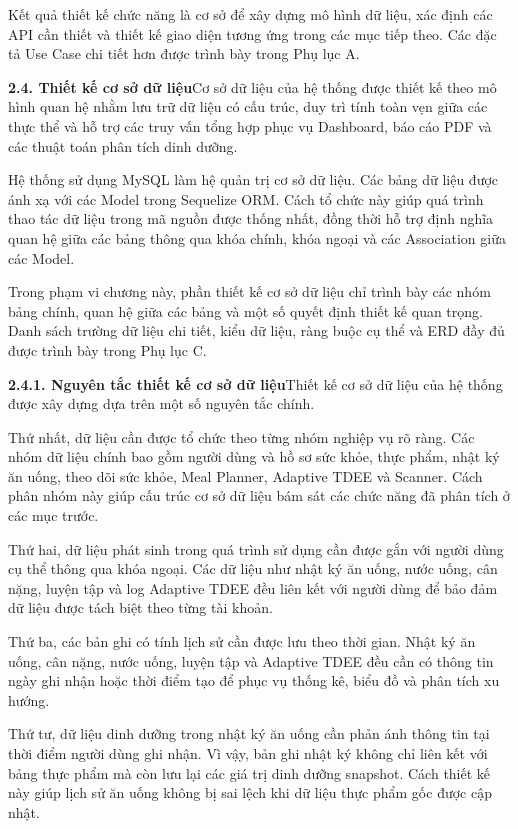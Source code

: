 Kết quả thiết kế chức năng là cơ sở để xây dựng mô hình dữ liệu, xác định các API cần thiết và thiết kế giao diện tương ứng trong các mục tiếp theo. Các đặc tả Use Case chi tiết hơn được trình bày trong Phụ lục A.

\textbf{2.4. Thiết kế cơ sở dữ liệu}Cơ sở dữ liệu của hệ thống được thiết kế theo mô hình quan hệ nhằm lưu trữ dữ liệu có cấu trúc, duy trì tính toàn vẹn giữa các thực thể và hỗ trợ các truy vấn tổng hợp phục vụ Dashboard, báo cáo PDF và các thuật toán phân tích dinh dưỡng.

Hệ thống sử dụng MySQL làm hệ quản trị cơ sở dữ liệu. Các bảng dữ liệu được ánh xạ với các Model trong Sequelize ORM. Cách tổ chức này giúp quá trình thao tác dữ liệu trong mã nguồn được thống nhất, đồng thời hỗ trợ định nghĩa quan hệ giữa các bảng thông qua khóa chính, khóa ngoại và các Association giữa các Model.

Trong phạm vi chương này, phần thiết kế cơ sở dữ liệu chỉ trình bày các nhóm bảng chính, quan hệ giữa các bảng và một số quyết định thiết kế quan trọng. Danh sách trường dữ liệu chi tiết, kiểu dữ liệu, ràng buộc cụ thể và ERD đầy đủ được trình bày trong Phụ lục C.

\textbf{2.4.1. Nguyên tắc thiết kế cơ sở dữ liệu}Thiết kế cơ sở dữ liệu của hệ thống được xây dựng dựa trên một số nguyên tắc chính.

Thứ nhất, dữ liệu cần được tổ chức theo từng nhóm nghiệp vụ rõ ràng. Các nhóm dữ liệu chính bao gồm người dùng và hồ sơ sức khỏe, thực phẩm, nhật ký ăn uống, theo dõi sức khỏe, Meal Planner, Adaptive TDEE và Scanner. Cách phân nhóm này giúp cấu trúc cơ sở dữ liệu bám sát các chức năng đã phân tích ở các mục trước.

Thứ hai, dữ liệu phát sinh trong quá trình sử dụng cần được gắn với người dùng cụ thể thông qua khóa ngoại. Các dữ liệu như nhật ký ăn uống, nước uống, cân nặng, luyện tập và log Adaptive TDEE đều liên kết với người dùng để bảo đảm dữ liệu được tách biệt theo từng tài khoản.

Thứ ba, các bản ghi có tính lịch sử cần được lưu theo thời gian. Nhật ký ăn uống, cân nặng, nước uống, luyện tập và Adaptive TDEE đều cần có thông tin ngày ghi nhận hoặc thời điểm tạo để phục vụ thống kê, biểu đồ và phân tích xu hướng.

Thứ tư, dữ liệu dinh dưỡng trong nhật ký ăn uống cần phản ánh thông tin tại thời điểm người dùng ghi nhận. Vì vậy, bản ghi nhật ký không chỉ liên kết với bảng thực phẩm mà còn lưu lại các giá trị dinh dưỡng snapshot. Cách thiết kế này giúp lịch sử ăn uống không bị sai lệch khi dữ liệu thực phẩm gốc được cập nhật.

